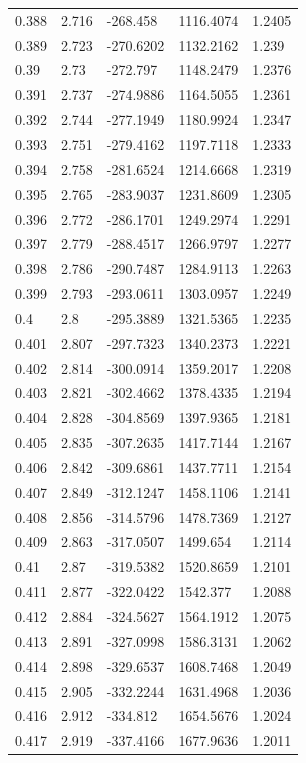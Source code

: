 \begin{tabular}{lllll}
0.388 & 2.716 & -268.458 & 1116.4074 & 1.2405 \\
0.389 & 2.723 & -270.6202 & 1132.2162 & 1.239 \\
0.39 & 2.73 & -272.797 & 1148.2479 & 1.2376 \\
0.391 & 2.737 & -274.9886 & 1164.5055 & 1.2361 \\
0.392 & 2.744 & -277.1949 & 1180.9924 & 1.2347 \\
0.393 & 2.751 & -279.4162 & 1197.7118 & 1.2333 \\
0.394 & 2.758 & -281.6524 & 1214.6668 & 1.2319 \\
0.395 & 2.765 & -283.9037 & 1231.8609 & 1.2305 \\
0.396 & 2.772 & -286.1701 & 1249.2974 & 1.2291 \\
0.397 & 2.779 & -288.4517 & 1266.9797 & 1.2277 \\
0.398 & 2.786 & -290.7487 & 1284.9113 & 1.2263 \\
0.399 & 2.793 & -293.0611 & 1303.0957 & 1.2249 \\
0.4 & 2.8 & -295.3889 & 1321.5365 & 1.2235 \\
0.401 & 2.807 & -297.7323 & 1340.2373 & 1.2221 \\
0.402 & 2.814 & -300.0914 & 1359.2017 & 1.2208 \\
0.403 & 2.821 & -302.4662 & 1378.4335 & 1.2194 \\
0.404 & 2.828 & -304.8569 & 1397.9365 & 1.2181 \\
0.405 & 2.835 & -307.2635 & 1417.7144 & 1.2167 \\
0.406 & 2.842 & -309.6861 & 1437.7711 & 1.2154 \\
0.407 & 2.849 & -312.1247 & 1458.1106 & 1.2141 \\
0.408 & 2.856 & -314.5796 & 1478.7369 & 1.2127 \\
0.409 & 2.863 & -317.0507 & 1499.654 & 1.2114 \\
0.41 & 2.87 & -319.5382 & 1520.8659 & 1.2101 \\
0.411 & 2.877 & -322.0422 & 1542.377 & 1.2088 \\
0.412 & 2.884 & -324.5627 & 1564.1912 & 1.2075 \\
0.413 & 2.891 & -327.0998 & 1586.3131 & 1.2062 \\
0.414 & 2.898 & -329.6537 & 1608.7468 & 1.2049 \\
0.415 & 2.905 & -332.2244 & 1631.4968 & 1.2036 \\
0.416 & 2.912 & -334.812 & 1654.5676 & 1.2024 \\
0.417 & 2.919 & -337.4166 & 1677.9636 & 1.2011 \\

\end{tabular}
